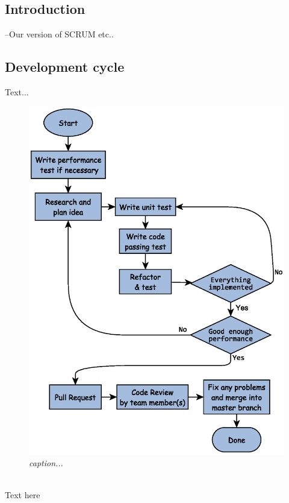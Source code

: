 \subsection{Introduction}
--Our version of SCRUM etc..
\newpage
\subsection{Development cycle}
Text...
\begin{figure}[htb]
	\centering
	\includegraphics[width=120mm]{images/sprint_item_development.eps}
	\caption{\textit{caption...}}
	\label{fig:sprint_development_cycle}
\end{figure}\\
Text here
